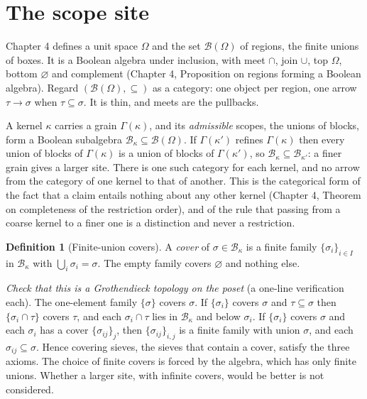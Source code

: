 \documentclass[11pt]{article}
\theoremstyle{plain}
\theoremstyle{definition}
\newtheorem{definition}[theorem]{Definition}
\theoremstyle{remark}
\newcommand{\Om}{\Omega}
\newcommand{\B}{\mathcal{B}}
\begin{document}
\section{The scope site}\label{sec:site}

Chapter 4 defines a unit space $\Om$ and the set $\B(\Om)$ of regions, the finite unions of boxes. It is a Boolean algebra under inclusion, with meet $\cap$, join $\cup$, top $\Om$, bottom $\varnothing$ and complement (Chapter 4, Proposition on regions forming a Boolean algebra). Regard $(\B(\Om),\subseteq)$ as a category: one object per region, one arrow $\tau\to\sigma$ when $\tau\subseteq\sigma$. It is thin, and meets are the pullbacks.

A kernel $\kappa$ carries a grain $\Gamma(\kappa)$, and its \emph{admissible} scopes, the unions of blocks, form a Boolean subalgebra $\B_\kappa\subseteq\B(\Om)$. If $\Gamma(\kappa')$ refines $\Gamma(\kappa)$ then every union of blocks of $\Gamma(\kappa)$ is a union of blocks of $\Gamma(\kappa')$, so $\B_\kappa\subseteq\B_{\kappa'}$: a finer grain gives a larger site. There is one such category for each kernel, and no arrow from the category of one kernel to that of another. This is the categorical form of the fact that a claim entails nothing about any other kernel (Chapter 4, Theorem on completeness of the restriction order), and of the rule that passing from a coarse kernel to a finer one is a distinction and never a restriction.

\begin{definition}[Finite-union covers]\label{def:cover}
A \emph{cover} of $\sigma\in\B_\kappa$ is a finite family $\{\sigma_i\}_{i\in I}$ in $\B_\kappa$ with $\bigcup_i\sigma_i=\sigma$. The empty family covers $\varnothing$ and nothing else.
\end{definition}

\emph{Check that this is a Grothendieck topology on the poset} (a one-line verification each). The one-element family $\{\sigma\}$ covers $\sigma$. If $\{\sigma_i\}$ covers $\sigma$ and $\tau\subseteq\sigma$ then $\{\sigma_i\cap\tau\}$ covers $\tau$, and each $\sigma_i\cap\tau$ lies in $\B_\kappa$ and below $\sigma_i$. If $\{\sigma_i\}$ covers $\sigma$ and each $\sigma_i$ has a cover $\{\sigma_{ij}\}_j$, then $\{\sigma_{ij}\}_{i,j}$ is a finite family with union $\sigma$, and each $\sigma_{ij}\subseteq\sigma$. Hence covering sieves, the sieves that contain a cover, satisfy the three axioms. %
The choice of finite covers is forced by the algebra, which has only finite unions. Whether a larger site, with infinite covers, would be better is not considered.
\end{document}
